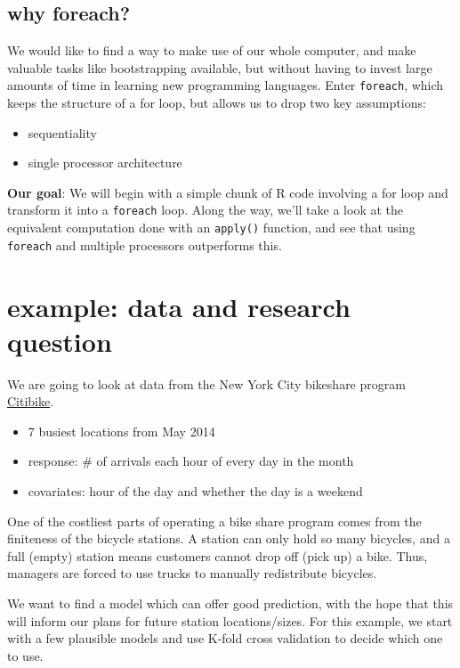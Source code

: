 \documentclass[]{article}
\begin{document}
\subsection{why foreach?}\label{why-foreach}

We would like to find a way to make use of our whole computer, and make
valuable tasks like bootstrapping available, but without having to
invest large amounts of time in learning new programming languages.
Enter \texttt{foreach}, which keeps the structure of a for loop, but
allows us to drop two key assumptions:

\begin{itemize}
\itemsep1pt\parskip0pt
\item
  sequentiality
\item
  single processor architecture
\end{itemize}

{\textbf{Our goal}}: We will begin with a simple chunk of R code
involving a for loop and transform it into a \texttt{foreach} loop.
Along the way, we'll take a look at the equivalent computation done with
an \texttt{apply()} function, and see that using \texttt{foreach} and
multiple processors outperforms this.

\section{example: data and research
question}\label{example-data-and-research-question}

We are going to look at data from the New York City bikeshare program
\href{https://www.citibikenyc.com/}{Citibike}.

\begin{itemize}
\itemsep1pt\parskip0pt
\item
  7 busiest locations from May 2014
\item
  response: \# of arrivals each hour of every day in the month
\item
  covariates: hour of the day and whether the day is a weekend
\end{itemize}

One of the costliest parts of operating a bike share program comes from
the finiteness of the bicycle stations. A station can only hold so many
bicycles, and a full (empty) station means customers cannot drop off
(pick up) a bike. Thus, managers are forced to use trucks to manually
redistribute bicycles.

We want to find a model which can offer good prediction, with the hope
that this will inform our plans for future station locations/sizes. For
this example, we start with a few plausible models and use K-fold cross
validation to decide which one to use.
\end{document}
